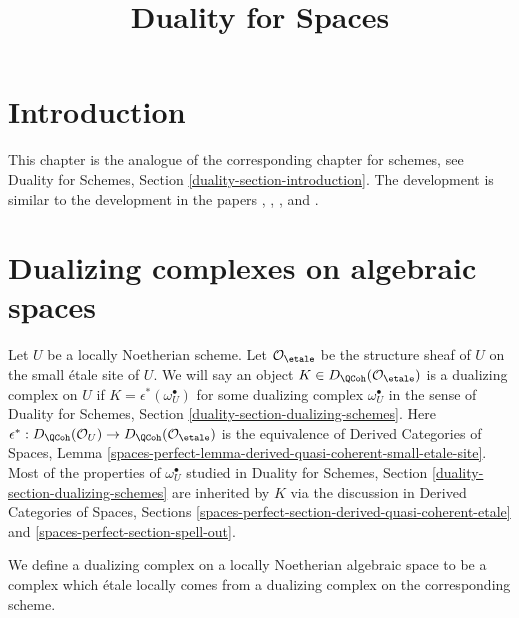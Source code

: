 

%


\title{Duality for Spaces}


\maketitle

\label{section-phantom}

\tableofcontents

\section{Introduction}
\label{section-introduction}

\noindent
This chapter is the analogue of the corresponding chapter for
schemes, see Duality for Schemes, Section \ref{duality-section-introduction}.
The development is similar to the development in the papers
\cite{Neeman-Grothendieck}, \cite{LN},
\cite{Lipman-notes}, and \cite{Neeman-improvement}.




\section{Dualizing complexes on algebraic spaces}
\label{section-dualizing-spaces}

\noindent
Let $U$ be a locally Noetherian scheme. Let $\mathcal{O}_\etale$
be the structure sheaf of $U$ on the small \'etale site of $U$.
We will say an object $K \in D_\QCoh(\mathcal{O}_\etale)$ is
a dualizing complex on $U$ if $K = \epsilon^*(\omega_U^\bullet)$
for some dualizing complex $\omega_U^\bullet$ in the sense of
Duality for Schemes, Section \ref{duality-section-dualizing-schemes}.
Here $\epsilon^* : D_\QCoh(\mathcal{O}_U) \to D_\QCoh(\mathcal{O}_\etale)$
is the equivalence of Derived Categories of Spaces, Lemma
\ref{spaces-perfect-lemma-derived-quasi-coherent-small-etale-site}.
Most of the properties of $\omega_U^\bullet$ studied in
Duality for Schemes, Section \ref{duality-section-dualizing-schemes}
are inherited by $K$ via the discussion in
Derived Categories of Spaces, Sections
\ref{spaces-perfect-section-derived-quasi-coherent-etale} and
\ref{spaces-perfect-section-spell-out}.

\medskip\noindent
We define a dualizing complex on a locally Noetherian algebraic space
to be a complex which \'etale locally comes from a dualizing
complex on the corresponding scheme.

